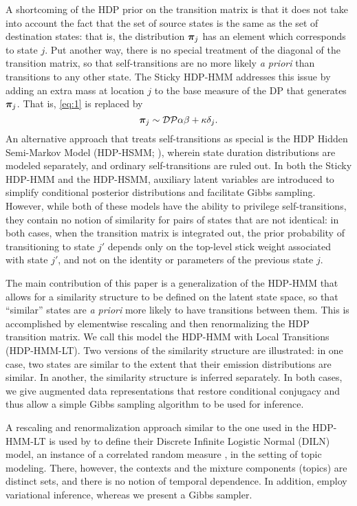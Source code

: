 A shortcoming of the HDP prior on the transition matrix 
is that it does not take into account the fact that the set of source states is the same
as the set of destination states: that is, the distribution $\boldsymbol{\pi}_j$
has an element which corresponds to state $j$.  Put another way, there
is no special treatment of the diagonal of the transition matrix, so
that self-transitions are no more likely {\it a priori} than
transitions to any other state.  The Sticky HDP-HMM \cite{fox2008hdp}
addresses this issue by adding an extra mass at location $j$ to the base
measure of the DP that generates $\boldsymbol{\pi}_j$.  That is, \eqref{eq:1} is replaced by
\begin{equation}
  \label{eq:6}
  \boldsymbol{\pi}_j \sim \mathcal{DP}{\alpha\beta + \kappa \delta_j}.
\end{equation}
An alternative approach that treats self-transitions as special 
is the HDP Hidden Semi-Markov Model (HDP-HSMM;
\citet{johnson2013bayesian}), wherein state duration distributions are modeled
separately, and ordinary self-transitions are ruled out.  In both the
Sticky HDP-HMM and the HDP-HSMM, auxiliary latent variables are introduced to simplify
conditional posterior distributions and facilitate Gibbs sampling.
However, while both of these models have the ability to privilege
self-transitions, they contain no notion of
similarity for pairs of states that are not identical: 
in both cases, when the transition matrix
is integrated out, the prior probability of
transitioning to state $j'$ depends only on the top-level stick
weight associated with state $j'$, and not on the identity or
parameters of the previous state $j$.

The main contribution of this paper is a generalization of the HDP-HMM that allows for a
similarity structure to be defined on the latent state space, so that
``similar'' states are {\em a priori} more likely to have transitions between
them.  This is accomplished by elementwise rescaling and then
renormalizing the HDP transition matrix.  We call this model the
HDP-HMM with Local Transitions (HDP-HMM-LT).  Two versions of the
similarity structure are illustrated: in one case, two states are
similar to the extent that their emission distributions are similar.
In another, the similarity structure is inferred separately.
In both cases, we give augmented data representations that restore
conditional conjugacy and thus allow a simple Gibbs sampling algorithm
to be used for inference.

A rescaling and renormalization approach similar to the one used in
the HDP-HMM-LT is used by \citet{paisley2012discrete} to define their
Discrete Infinite Logistic Normal (DILN) model, an instance of a 
correlated random measure \cite{ranganath2016correlated}, in the setting of
topic modeling.  There, however, the contexts and the mixture components
(topics) are distinct sets, and there is no notion of temporal
dependence.  In addition, \citet{paisley2012discrete} employ variational
inference, whereas we present a Gibbs sampler.  

